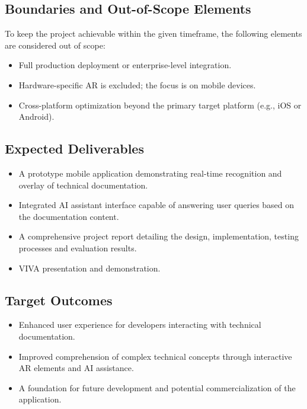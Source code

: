 \documentclass[12pt]{article}
\begin{document}
    \subsection{Boundaries and Out-of-Scope Elements}
    To keep the project achievable within the given timeframe, the following elements are considered out of scope:
    \begin{itemize}
        \item Full production deployment or enterprise-level integration.
        \item Hardware-specific AR is excluded; the focus is on mobile devices.
        \item Cross-platform optimization beyond the primary target platform (e.g., iOS or Android).
    \end{itemize}

    \subsection{Expected Deliverables}
    \begin{itemize}
        \item A prototype mobile application demonstrating real-time recognition and overlay of technical documentation.
        \item Integrated AI assistant interface capable of answering user queries based on the documentation content.
        \item A comprehensive project report detailing the design, implementation, testing processes and evaluation results.
        \item VIVA presentation and demonstration.
    \end{itemize}

    \subsection{Target Outcomes}
    \begin{itemize}
        \item Enhanced user experience for developers interacting with technical documentation.
        \item Improved comprehension of complex technical concepts through interactive AR elements and AI assistance.
        \item A foundation for future development and potential commercialization of the application.
    \end{itemize}
\end{document}
